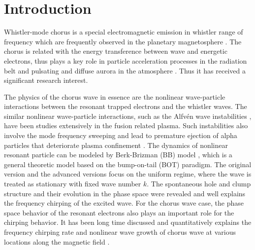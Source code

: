 \section{Introduction}
\label{sec:intro}
Whistler-mode chorus is a special electromagnetic emission in whistler range of frequency which are frequently observed in the planetary magnetosphere \cite{burtis_magnetospheric_1976,tsurutani_postmidnight_1974}.
The chorus is related with the energy transference between wave and energetic electrons, thus plays a key role in particle acceleration processes in the radiation belt \cite{horne_wave_2005,thorne_rapid_2013,reeves_electron_2013} and pulsating and diffuse aurora in the atmosphere \cite{nishimura_identifying_2010,kasahara_pulsating_2018,thorne_scattering_2010}. Thus it has received a significant research interest.  

The physics of the chorus wave in essence are the nonlinear wave-particle interactions between the resonant trapped electrons and the whistler waves. 
The similar nonlinear wave-particle interactions, such as the Alfv\'en wave instabilities \cite{chen2016,wang2018}, have been studies extensively in the fusion related plasma.
Such instabilities also involve the mode frequency sweeping and lead to premature ejection of alpha particles that deteriorate plasma confinement \cite{fasoli2007}.
The dynamics of nonlinear resonant particle can be modeled by Berk-Brizman (BB) model \cite{berk_spontaneous_1997}, which is a general theoretic model based on the bump-on-tail (BOT) paradigm. 
The original version and the advanced versions \cite{lilley_formation_2014} focus on the uniform regime, where the wave is treated as stationary with fixed wave number $k$. 
The spontaneous hole and clump structure and their evolution in the phase space were revealed and well explains the frequency chirping of the excited wave.
For the chorus wave case, the phase space behavior of the resonant electrons also plays an important role for the  chirping behavior. 
It has been long time discussed \cite{sudan_theory_1971} and quantitatively explains the frequency chirping rate and nonlinear wave growth of chorus wave at various locations along the magnetic field \cite{omura_theory_2008,omura_nonlinear_2021}.

